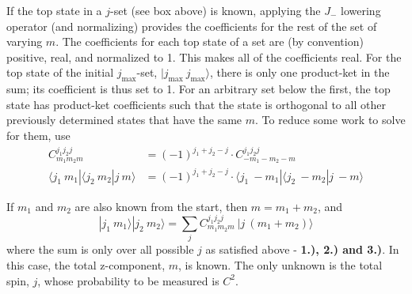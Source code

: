 \documentclass[12pt]{article}
\begin{document}
\vspace{15pt} 
    If the top state in a \(j\)-set (see box above) is known, applying the \(J_-\) lowering operator (and normalizing) %
provides the coefficients for the rest of the set of varying \(m\). %
The coefficients for each top state of a set are (by convention) positive, real, %
and normalized to 1. This makes all of the coefficients real. For the top state of the initial %
\(j_\text{max}\)-set, \( | j_\text{max}\ j_\text{max} \rangle\), %
there is only one product-ket in the sum; its coefficient %
is thus set to 1. For an arbitrary set below the first, the top state has product-ket coefficients such that the state %
is orthogonal to all other previously determined states that have the same \(m\). To reduce some work to solve for them, use %
\[ 
    \begin{aligned}
        C^{j_1 j_2 j}_{m_{1} m_{2} m} & = (-1)^{j_1 + j_2-  j} \cdot C^{j_1 j_2 j}_{-m_{1} -m_{2} -m}\\[5pt]
        \langle j_1 \ m_1 | \langle j_2\ m_2 | j\ m \rangle & 
            = (-1)^{j_1 + j_2-  j} \cdot \langle j_1 \ -m_1 | \langle j_2\ -m_2 | j\ -m\rangle 
    \end{aligned}
\]

\vspace{15pt} 
    If \(m_1\) and \(m_2\) are also known from the start, then \(m = m_1 + m_2\), and
\[ 
    \boxed{ 
        | j_1 \ m_1 \rangle | j_2 \ m_2 \rangle 
        = \sum_j C^{j_1 j_2 j}_{m_{1} m_{2} m} \ | j \ {\scriptstyle (m_1+m_2)} \rangle 
    } 
\]
where the sum is only over all possible \(j\) as satisfied above - \textbf{1.), 2.) and 3.)}.
In this case, the total z-component, \(m\), is known. The only unknown is the total spin, \(j\), 
whose probability to be measured is \(C^2\).
\end{document}
